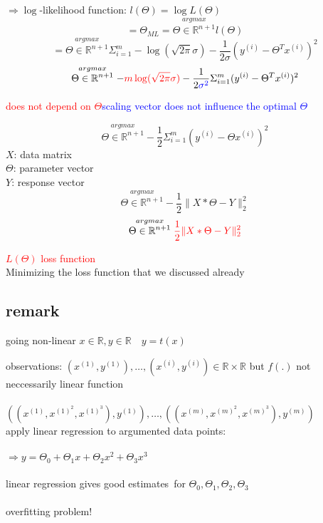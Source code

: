 \documentclass[a4paper, 12pt]{scrartcl}
\begin{document}
\begin{enumerate}[(1)]
$\Rightarrow \log$-likelihood function: $l(\Theta) = \log L(\Theta)$
\[ = \Theta_{ML} = \stackrel{argmax}{\Theta \in \mathbb{R}^{n+1}} l(\Theta)\]
\[ = \stackrel{argmax}{\Theta \in \mathbb{R}^{n+1}} \Sigma^m_{i=1} - \log (\sqrt{2\pi}\sigma) - \frac{1}{2\sigma}(y^{(i)} - \Theta^T x^{(i)})^2\]
\[\stackrel{argmax}{\Theta \in \mathbb{R}^{n+1}} - \textcolor{red}{m \log (\sqrt{2\pi}\sigma)} - \frac{1}{2\textcolor{blue}{\sigma^2}}\Sigma^m_{i=1}(y^{(i)} - \Theta^T x^{(i)})^2  \]
\begin{center}
\textcolor{red}{does not depend on $\Theta$}\space\space\space \textcolor{blue}{scaling vector does not influence the optimal $\Theta$}
\end{center}
\[ \stackrel{argmax}{\Theta \in \mathbb{R}^{n+1}} -\frac{1}{2} \Sigma^m_{i=1}(y^{(i)}-\Theta x^{(i)})^2\]
$X$: data matrix\\
$\Theta$: parameter vector\\
$Y$: response vector
\[\stackrel{argmax}{\Theta \in \mathbb{R}^{n+1}} -\frac{1}{2} \lVert X * \Theta - Y \lVert^2_2\]
\[ \stackrel{argmax}{\Theta \in \mathbb{R}^{n+1}} \textcolor{red}{\frac{1}{2} \lVert X * \Theta - Y \lVert^2_2}\]
\begin{center}
\textcolor{red}{$L(\Theta)$ loss function}\\
Minimizing the loss function that we discussed already\\
\end{center}
\end{enumerate}
\subsection*{remark} going non-linear $x \in \mathbb{R}, y \in \mathbb{R} \quad y=t(x)$
\begin{addmargin}[2 cm]{0 cm}
observations: $(x^{(1)}, y^{(1)}), \dots ,(x^{(i)}, y^{(i)}) \in \mathbb{R} \times \mathbb{R}$ but $f(.)$ not neccessarily linear function\\\\
$((x^{(1)},x^{(1)^2}, x^{(1)^3}), y^{(1)}), \dots , ((x^{(m)},x^{(m)^2}, x^{(m)^3}), y^{(m)})$\\
apply linear regression to argumented data points:\\\\
$\Rightarrow y = \Theta_0 + \Theta_1  x + \Theta_2  x^2 + \Theta_3 x^3$\\\\
linear regression gives \glqq good estimates\grqq\ for $\Theta_0, \Theta_1, \Theta_2, \Theta_3$\\\\
overfitting problem!
\end{addmargin} 
\end{document}
